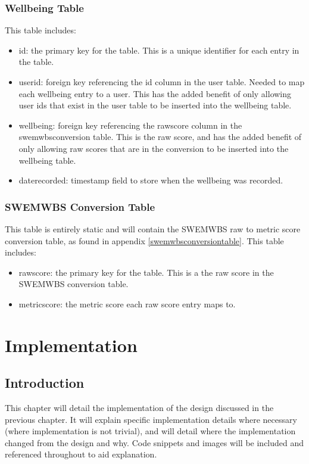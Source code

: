\documentclass[11pt,openright,a4paper]{report}
\begin{document}
\subsection{Wellbeing Table}
This table includes:
\begin{itemize}
\item id: the primary key for the table. This is a unique identifier for each entry in the table.
\item user\textunderscore id: foreign key referencing the id column in the user table. Needed to map each wellbeing entry to a user. This has the added benefit of only allowing user ids that exist in the user table to be inserted into the wellbeing table.
\item wellbeing: foreign key referencing the raw\textunderscore score column in the swemwbs\textunderscore conversion table. This is the raw score, and has the added benefit of only allowing raw scores that are in the conversion to be inserted into the wellbeing table.
\item date\textunderscore recorded: timestamp field to store when the wellbeing was recorded.
\end{itemize}

\subsection{SWEMWBS Conversion Table}
This table is entirely static and will contain the SWEMWBS raw to metric score conversion table, as found in appendix \ref{swemwbsconversiontable}. This table includes:
\begin{itemize}
\item raw\textunderscore score: the primary key for the table. This is a the raw score in the SWEMWBS conversion table.
\item metric\textunderscore score: the metric score each raw score entry maps to.
\end{itemize}

\chapter{Implementation}
\section{Introduction}
This chapter will detail the implementation of the design discussed in the previous chapter. It will explain specific implementation details where necessary (where implementation is not trivial), and will detail where the implementation changed from the design and why. Code snippets and images will be included and referenced throughout to aid explanation.
\end{document}
